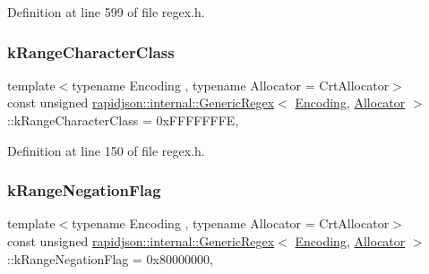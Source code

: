 Definition at line 599 of file regex.\+h.

\mbox{\label{classrapidjson_1_1internal_1_1_generic_regex_aa7d29b7d0fecaf6b59548de68578a4a7}} 
\subsubsection{\texorpdfstring{kRangeCharacterClass}{kRangeCharacterClass}}
{\footnotesize\ttfamily template$<$typename Encoding , typename Allocator  = Crt\+Allocator$>$ \\
const unsigned \mbox{\hyperlink{classrapidjson_1_1internal_1_1_generic_regex}{rapidjson\+::internal\+::\+Generic\+Regex}}$<$ \mbox{\hyperlink{classrapidjson_1_1_encoding}{Encoding}}, \mbox{\hyperlink{classrapidjson_1_1_allocator}{Allocator}} $>$\+::k\+Range\+Character\+Class = 0x\+F\+F\+F\+F\+F\+F\+FE\hspace{0.3cm}{\ttfamily [static]}, {\ttfamily [private]}}



Definition at line 150 of file regex.\+h.

\mbox{\label{classrapidjson_1_1internal_1_1_generic_regex_a7290d7984a4931d577257a7620ca8522}} 
\subsubsection{\texorpdfstring{kRangeNegationFlag}{kRangeNegationFlag}}
{\footnotesize\ttfamily template$<$typename Encoding , typename Allocator  = Crt\+Allocator$>$ \\
const unsigned \mbox{\hyperlink{classrapidjson_1_1internal_1_1_generic_regex}{rapidjson\+::internal\+::\+Generic\+Regex}}$<$ \mbox{\hyperlink{classrapidjson_1_1_encoding}{Encoding}}, \mbox{\hyperlink{classrapidjson_1_1_allocator}{Allocator}} $>$\+::k\+Range\+Negation\+Flag = 0x80000000\hspace{0.3cm}{\ttfamily [static]}, {\ttfamily [private]}}



